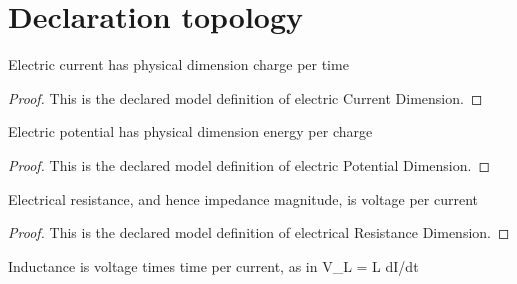 \section{Declaration topology}
\begin{definition}
  \label{def:physics:phyx-mini-0888:phyxminiproblems-problemphyxmini0888-electriccurrentdimension}
  Electric current has physical dimension charge per time
\end{definition}
\begin{proof}
  This is the declared model definition of electric Current Dimension.
\end{proof}
\begin{definition}
  \label{def:physics:phyx-mini-0888:phyxminiproblems-problemphyxmini0888-electricpotentialdimension}
  Electric potential has physical dimension energy per charge
\end{definition}
\begin{proof}
  This is the declared model definition of electric Potential Dimension.
\end{proof}
\begin{definition}
  \label{def:physics:phyx-mini-0888:phyxminiproblems-problemphyxmini0888-electricalresistancedimension}
  Electrical resistance, and hence impedance magnitude, is voltage per current
\end{definition}
\begin{proof}
  This is the declared model definition of electrical Resistance Dimension.
\end{proof}
\begin{definition}
  \label{def:physics:phyx-mini-0888:phyxminiproblems-problemphyxmini0888-inductancedimension}
  Inductance is voltage times time per current, as in V\_L = L dI/dt
\end{definition}
